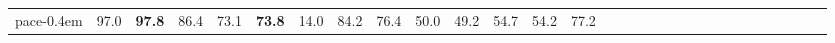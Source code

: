 \begin{table*}[]
\begin{tabular}{cc|cccccccccccccccccccccccccccc}
pace{-0.4em} & \hspace{-0.9em}97.0\hspace{-0.4em} & \hspace{-0.9em}\textbf{97.8}\hspace{-0.4em} & \hspace{-0.9em}86.4\hspace{-0.4em} & \hspace{-0.9em}73.1\hspace{-0.4em} & \hspace{-0.9em}\textbf{73.8}\hspace{-0.4em} & \hspace{-0.9em}14.0\hspace{-0.4em} & \hspace{-0.9em}84.2\hspace{-0.4em} & \hspace{-0.9em}76.4\hspace{-0.4em} & \hspace{-0.9em}50.0\hspace{-0.4em} & \hspace{-0.9em}49.2\hspace{-0.4em} & \hspace{-0.9em}54.7\hspace{-0.4em} & \hspace{-0.9em}54.2\hspace{-0.4em} & \hspace{-0.9em}77.2\hspace{-0.4em} 
        \\

\end{tabular}
\end{table*}
